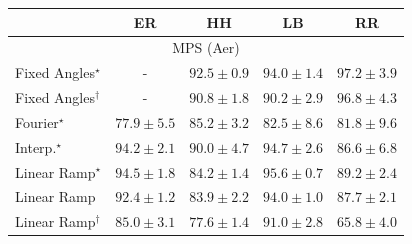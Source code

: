 \begin{tabular}{l|cccc|}
\toprule
            & ER & HH & LB & RR \\
\midrule
\multicolumn{5}{c}{\rule{0pt}{8pt}MPS (Aer)} \\
\midrule
Fixed Angles$^\star$ & {\cellcolor[HTML]{000000}} \color[HTML]{F1F1F1} {\cellcolor{white}} \color{black} - & {\cellcolor[HTML]{7E0E79}} \color[HTML]{F1F1F1} $92.5\pm 0.9$ & {\cellcolor[HTML]{710A6D}} \color[HTML]{F1F1F1} $94.0\pm 1.4$ & {\cellcolor[HTML]{540251}} \color[HTML]{F1F1F1} $97.2\pm 3.9$ \\
Fixed Angles$^\dagger$ & {\cellcolor[HTML]{000000}} \color[HTML]{F1F1F1} {\cellcolor{white}} \color{black} - & {\cellcolor[HTML]{831A83}} \color[HTML]{F1F1F1} $90.8\pm 1.8$ & {\cellcolor[HTML]{832088}} \color[HTML]{F1F1F1} $90.2\pm 2.9$ & {\cellcolor[HTML]{570354}} \color[HTML]{F1F1F1} $96.8\pm 4.3$ \\
Fourier$^\star$ & {\cellcolor[HTML]{8C80BB}} \color[HTML]{F1F1F1} $77.9\pm 5.5$ & {\cellcolor[HTML]{894BA2}} \color[HTML]{F1F1F1} $85.2\pm 3.2$ & {\cellcolor[HTML]{8B5EAB}} \color[HTML]{F1F1F1} $82.5\pm 8.6$ & {\cellcolor[HTML]{8B62AD}} \color[HTML]{F1F1F1} $81.8\pm 9.6$ \\
Interp.$^\star$ & {\cellcolor[HTML]{6F0A6B}} \color[HTML]{F1F1F1} $94.2\pm 2.1$ & {\cellcolor[HTML]{842289}} \color[HTML]{F1F1F1} $90.0\pm 4.7$ & {\cellcolor[HTML]{6A0867}} \color[HTML]{F1F1F1} $94.7\pm 2.6$ & {\cellcolor[HTML]{88409C}} \color[HTML]{F1F1F1} $86.6\pm 6.8$ \\
Linear Ramp$^\star$ & {\cellcolor[HTML]{6C0968}} \color[HTML]{F1F1F1} $94.5\pm 1.8$ & {\cellcolor[HTML]{8A51A5}} \color[HTML]{F1F1F1} $84.2\pm 1.4$ & {\cellcolor[HTML]{62065F}} \color[HTML]{F1F1F1} $95.6\pm 0.7$ & {\cellcolor[HTML]{85288D}} \color[HTML]{F1F1F1} $89.2\pm 2.4$ \\
Linear Ramp & {\cellcolor[HTML]{800F7B}} \color[HTML]{F1F1F1} $92.4\pm 1.2$ & {\cellcolor[HTML]{8A54A6}} \color[HTML]{F1F1F1} $83.9\pm 2.2$ & {\cellcolor[HTML]{710A6D}} \color[HTML]{F1F1F1} $94.0\pm 1.0$ & {\cellcolor[HTML]{873696}} \color[HTML]{F1F1F1} $87.7\pm 2.1$ \\
Linear Ramp$^\dagger$ & {\cellcolor[HTML]{894CA2}} \color[HTML]{F1F1F1} $85.0\pm 3.1$ & {\cellcolor[HTML]{8C82BC}} \color[HTML]{F1F1F1} $77.6\pm 1.4$ & {\cellcolor[HTML]{821982}} \color[HTML]{F1F1F1} $91.0\pm 2.8$ & {\cellcolor[HTML]{B1C9E1}} \color[HTML]{000000} $65.8\pm 4.0$ \\

\end{tabular}
